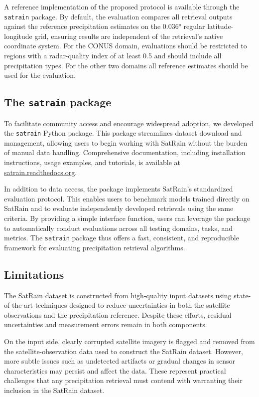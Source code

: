 \documentclass[11pt]{article}
\begin{document}
A reference implementation of the proposed protocol is available through the
\texttt{satrain} package. By default, the evaluation compares all retrieval
outputs against the reference precipitation estimates on the 0.036° regular
latitude-longitude grid, ensuring results are independent of the retrieval’s
native coordinate system. For the CONUS domain, evaluations should be restricted
to regions with a radar-quality index of at least 0.5 and should include all
precipitation types. For the other two domains all reference estimates should be
used for the evaluation.


\subsection{The \texttt{satrain} package}

To facilitate community access and encourage widespread adoption, we developed
the \texttt{satrain} Python package. This package streamlines dataset download
and management, allowing users to begin working with SatRain without the burden
of manual data handling. Comprehensive documentation, including installation
instructions, usage examples, and tutorials, is available at
\url{satrain.readthedocs.org}.

In addition to data access, the package implements SatRain’s standardized
evaluation protocol. This enables users to benchmark models trained directly on
SatRain and to evaluate independently developed retrievals using the same
criteria. By providing a simple interface function, users can leverage the
package to automatically conduct evaluations across all testing domains, tasks,
and metrics. The \texttt{satrain} package thus offers a fast, consistent, and
reproducible framework for evaluating precipitation retrieval algorithms.

\subsection{Limitations}

The SatRain dataset is constructed from high-quality input datasets using
state-of-the-art techniques designed to reduce uncertainties in both the
satellite observations and the precipitation reference. Despite these efforts,
residual uncertainties and measurement errors remain in both components.

On the input side, clearly corrupted satellite imagery is flagged and removed
from the satellite-observation data used to construct the SatRain dataset.
However, more subtle issues such as undetected artifacts or gradual changes in
sensor characteristics may persist and affect the data. These represent
practical challenges that any precipitation retrieval must contend with
warranting their inclusion in the SatRain dataset.
\end{document}
